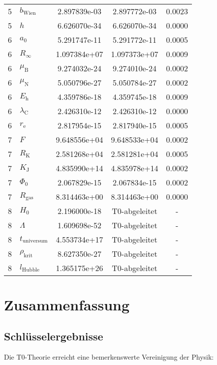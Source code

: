 \documentclass[11pt,a4paper]{article}
\begin{document}
\begin{longtable}{p{1.5cm}p{3cm}S[table-format=1.6e2]S[table-format=1.6e2]S[table-format=2.4]}
5 & $b_{\text{Wien}}$ & 2.897839e-03 & 2.897772e-03 & 0.0023 \\
5 & $h$ & 6.626070e-34 & 6.626070e-34 & 0.0000 \\
6 & $a_0$ & 5.291747e-11 & 5.291772e-11 & 0.0005 \\
6 & $R_{\infty}$ & 1.097384e+07 & 1.097373e+07 & 0.0009 \\
6 & $\mu_{\text{B}}$ & 9.274032e-24 & 9.274010e-24 & 0.0002 \\
6 & $\mu_{\text{N}}$ & 5.050796e-27 & 5.050784e-27 & 0.0002 \\
6 & $E_{\text{h}}$ & 4.359786e-18 & 4.359745e-18 & 0.0009 \\
6 & $\lambda_{\text{C}}$ & 2.426310e-12 & 2.426310e-12 & 0.0000 \\
6 & $r_{\text{e}}$ & 2.817954e-15 & 2.817940e-15 & 0.0005 \\
7 & $F$ & 9.648556e+04 & 9.648533e+04 & 0.0002 \\
7 & $R_{\text{K}}$ & 2.581268e+04 & 2.581281e+04 & 0.0005 \\
7 & $K_{\text{J}}$ & 4.835990e+14 & 4.835978e+14 & 0.0002 \\
7 & $\Phi_0$ & 2.067829e-15 & 2.067834e-15 & 0.0002 \\
7 & $R_{\text{gas}}$ & 8.314463e+00 & 8.314463e+00 & 0.0000 \\
8 & $H_0$ & 2.196000e-18 & {T0-abgeleitet} & {-} \\
8 & $\Lambda$ & 1.609698e-52 & {T0-abgeleitet} & {-} \\
8 & $t_{\text{universum}}$ & 4.553734e+17 & {T0-abgeleitet} & {-} \\
8 & $\rho_{\text{krit}}$ & 8.627350e-27 & {T0-abgeleitet} & {-} \\
8 & $l_{\text{Hubble}}$ & 1.365175e+26 & {T0-abgeleitet} & {-} \\
\end{longtable}

\section{Zusammenfassung}

\subsection{Schlüsselergebnisse}

Die T0-Theorie erreicht eine bemerkenswerte Vereinigung der Physik:
\end{document}
